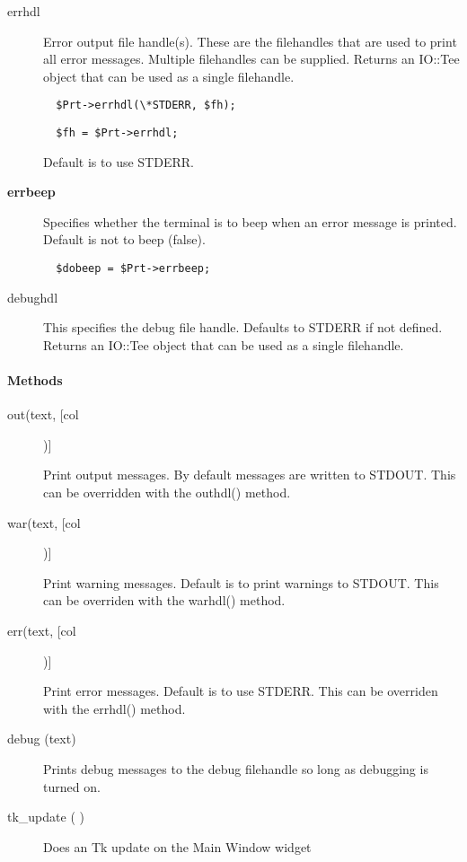 \begin{description}
\item[errhdl] \mbox{}

Error output file handle(s). These are the filehandles that are used
to print all error messages. Multiple filehandles can be supplied.
Returns an IO::Tee object that can be used as a single filehandle.

\begin{verbatim}
  $Prt->errhdl(\*STDERR, $fh);
\end{verbatim}
\begin{verbatim}
  $fh = $Prt->errhdl;
\end{verbatim}


Default is to use STDERR.

\item[\textbf{errbeep}] \mbox{}

Specifies whether the terminal is to beep when an error
message is printed. Default is not to beep (false).

\begin{verbatim}
  $dobeep = $Prt->errbeep;
\end{verbatim}
\item[debughdl] \mbox{}

This specifies the debug file handle. Defaults to STDERR if not 
defined. Returns an IO::Tee object that can be used as a single
filehandle.

\end{description}
\paragraph*{Methods\label{ORAC::Print_Methods}}\begin{description}
\item[out(text, [col])] \mbox{}

Print output messages.
By default messages are written to STDOUT. This can be overridden with
the outhdl() method.

\item[war(text, [col])] \mbox{}

Print warning messages.
Default is to print warnings to STDOUT. This can be overriden with
the warhdl() method.

\item[err(text, [col])] \mbox{}

Print error messages.
Default is to use STDERR. This can be overriden with the errhdl()
method.

\item[debug (text)] \mbox{}

Prints debug messages to the debug filehandle so long as debugging
is turned on.

\item[tk\_update ( )] \mbox{}

Does an Tk update on the Main Window widget

\end{description}
